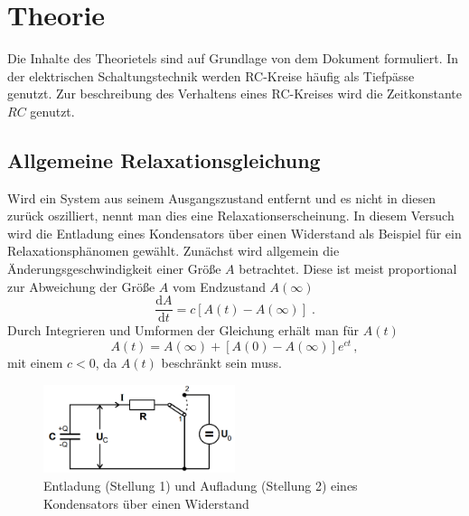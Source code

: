 \section{Theorie}
\label{sec:Theorie}
Die Inhalte des Theorietels sind auf Grundlage von dem Dokument \cite{V353} formuliert.
In der elektrischen Schaltungstechnik werden RC-Kreise häufig als Tiefpässe genutzt. 
Zur beschreibung des Verhaltens eines RC-Kreises wird die Zeitkonstante $RC$ genutzt.
\subsection{Allgemeine Relaxationsgleichung}
Wird ein System aus seinem Ausgangszustand entfernt und es nicht in diesen zurück oszilliert, nennt man dies eine Relaxationserscheinung.
In diesem Versuch wird die Entladung eines Kondensators über einen Widerstand als Beispiel für ein Relaxationsphänomen gewählt.
Zunächst wird allgemein die Änderungsgeschwindigkeit einer Größe $A$ betrachtet. Diese ist meist proportional zur Abweichung der Größe $A$ vom Endzustand $A(\infty)$
\begin{equation*}
    \frac{\text{d}A}{\text{d}t}=c[A(t)-A(\infty)] \; \text{.}
\end{equation*}
Durch Integrieren und Umformen der Gleichung erhält man für $A(t)$
\begin{equation}
    A(t)=A(\infty)+[A(0)-A(\infty)]e^{ct} \, ,
\end{equation}
mit einem $c<0$, da $A(t)$ beschränkt sein muss.
\begin{figure}
    \centering
    \caption{Entladung (Stellung 1) und Aufladung (Stellung 2) eines Kondensators über einen Widerstand} 
    \label{fig:auf-ent}
    \includegraphics[width = 0.5\textwidth]{pics/auf-ent.png}
\end{figure}
